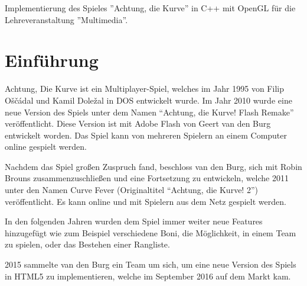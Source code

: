 \documentclass[doktyp=studarbeit]{TUBAFarbeiten}
\begin{document}
\maketitle

\TUBAFErklaerungsseite

Implementierung des Spieles ''Achtung, die Kurve'' in C++ mit OpenGL für die 
Lehreveranstaltung ''Multimedia''.




\tableofcontents

\newpage

\section{Einführung}

Achtung, Die Kurve ist ein Multiplayer-Spiel, welches im Jahr 1995 von 
Filip Oščádal und Kamil Doležal in DOS entwickelt wurde. Im Jahr 2010 wurde 
eine neue Version des Spiels unter dem Namen “Achtung, die Kurve! Flash Remake”
veröffentlicht. Diese Version ist mit Adobe Flash von Geert van den Burg 
entwickelt worden. Das Spiel kann von mehreren Spielern an einem Computer online gespielt werden.

Nachdem das Spiel großen Zuspruch fand, beschloss van den Burg, sich mit 
Robin Brouns zusammenzuschließen und eine Fortsetzung zu entwickeln, welche 
2011 unter den Namen Curve Fever (Originaltitel “Achtung, die Kurve! 2”) 
veröffentlicht. Es kann online und mit Spielern aus dem Netz gespielt werden.

In den folgenden Jahren wurden dem Spiel immer weiter neue Features 
hinzugefügt wie zum Beispiel verschiedene Boni, die Möglichkeit, in einem Team 
zu spielen, oder das Bestehen einer Rangliste.

2015 sammelte van den Burg ein Team um sich, um eine neue Version des Spiels in 
HTML5 zu implementieren, welche im September 2016 auf dem Markt kam.
\end{document}
